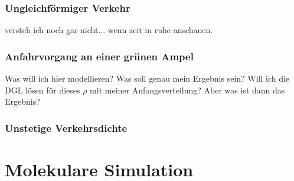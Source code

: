 \documentclass[]{article}
\begin{document}
\subsubsection*{Ungleichförmiger Verkehr}  
  
versteh ich noch gar nicht... wenn zeit in ruhe anschauen.

  
\subsubsection*{Anfahrvorgang an einer grünen Ampel}

Was will ich hier modellieren? Was soll genau mein Ergebnis sein? Will ich die DGL lösen für dieses $\rho$ mit meiner Anfangsverteilung? Aber was ist dann das Ergebnis? 

\subsubsection*{Unstetige Verkehrsdichte}



\section{Molekulare Simulation}

  
\end{document}
